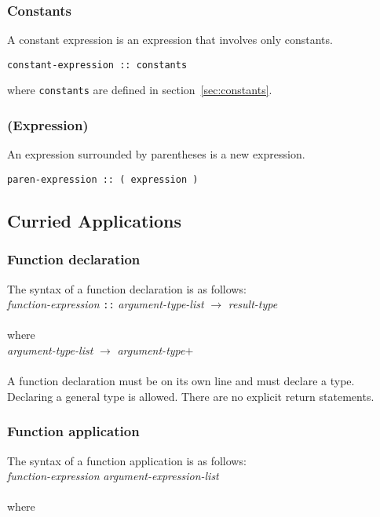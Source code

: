 \subsubsection{Constants}
A constant expression is an expression that involves only constants. 
\begin{verbatim}
constant-expression :: constants
\end{verbatim}
where \texttt{constants} are defined in section~\ref{sec:constants}.

\subsubsection{(Expression)}
An expression surrounded by parentheses is a new expression.
\begin{verbatim}
paren-expression :: ( expression )
\end{verbatim}


\subsection{Curried Applications}

    \subsubsection{Function declaration}
    The syntax of a function declaration is as follows: \\
    
    \emph{function-expression} \texttt{::}  \emph{argument-type-list} \texttt{$\rightarrow$} \emph{result-type} \\ \\
    where\\
    
    \emph{argument-type-list} $\rightarrow$ \emph{argument-type}$+$ \\ \\
    A function declaration must be on its own line and must declare a type. Declaring a general type is allowed. There are no explicit return statements.
  
    \subsubsection{Function application}
    The syntax of a function application is as follows: \\
        
    \emph{function-expression} \emph{argument-expression-list} \\ \\
    where\\
    
